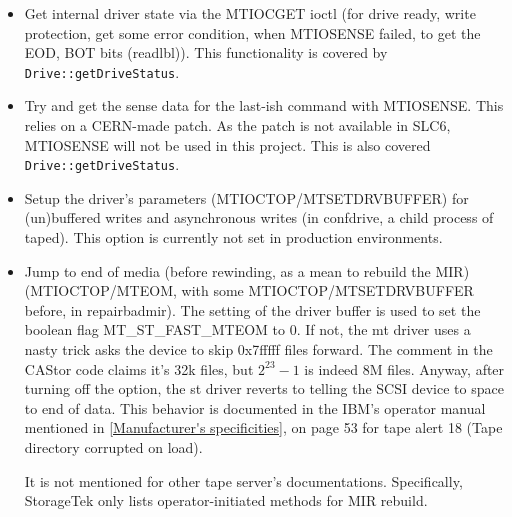 \begin{itemize}
\begin{itemize}
    \item Get internal driver state via the MTIOCGET ioctl (for drive ready, write protection, 
          get some error condition, when MTIOSENSE failed, to get the EOD, BOT bits (readlbl)).
          This functionality is covered by \verb#Drive::getDriveStatus#.
    \item Try and get the sense data for the last-ish command with MTIOSENSE. This
          relies on a CERN-made patch. As the patch is not available in SLC6, 
          MTIOSENSE will not be used in this project. This is also covered \verb#Drive::getDriveStatus#.
    \item Setup the driver's parameters (MTIOCTOP/MTSETDRVBUFFER) for (un)buffered 
          writes and asynchronous writes (in confdrive, a child process of taped).
          This option is currently not set in production environments.
    \item Jump to end of media (before rewinding, as a mean to rebuild the MIR) (MTIOCTOP/MTEOM, 
          with some MTIOCTOP/MTSETDRVBUFFER before, in repairbadmir). The setting of the driver
          buffer is used to set the boolean flag MT\_ST\_FAST\_MTEOM to 0. If not, the mt driver uses
          a nasty trick asks the device to skip 0x7fffff files forward. The comment in the CAStor code
          claims it's 32k files, but $2^{23}-1$ is indeed 8M files. Anyway, after turning off the 
          option, the st driver reverts to telling the SCSI device to space to end of data.
          This behavior is documented in the IBM's operator manual mentioned in \ref{Manufacturer's specificities},
          on page 53 for tape alert 18 (Tape directory corrupted on load).

          It is not mentioned for other tape server's documentations. Specifically, StorageTek
          only lists operator-initiated methods for MIR rebuild.


\end{itemize}
\end{itemize}
